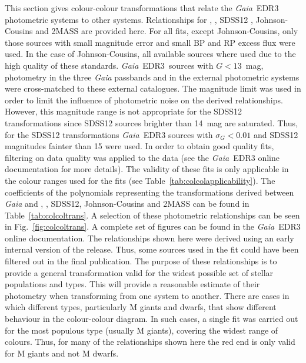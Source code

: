 \documentclass{aa}
\newcommand{\gaia}{\textit{Gaia}\xspace}
\newcommand{\edr}{\gaia~EDR3\xspace}
\newcommand{\xp}{BP and RP\xspace}
\newcommand{\figref}[1]{Fig.~\ref{fig:#1}}
\newcommand{\tabref}[1]{Table~\ref{tab:#1}}
\begin{document}
\begin{appendix}
This section gives colour-colour transformations that relate the \edr photometric systems to other systems. Relationships for
\hip \citep{1997ESASP1200.....E},
\tyctwo \citep{2000A&A...355L..27H},
SDSS12 \citep{2015ApJS..219...12A},
Johnson-Cousins \citep{2000PASP..112..925S} and
2MASS \citep{2006AJ....131.1163S}
are provided here. For all fits, except Johnson-Cousins, only those sources with small magnitude error and small \xp excess flux were used. In the case of Johnson-Cousins, all available sources where used due to the high quality of these standards.
\edr\ sources with $G<13$~mag, photometry in the three \gaia passbands and in the external photometric systems were cross-matched to these external catalogues. The magnitude limit was used in order to limit the influence of photometric noise on the derived relationships. However, this magnitude range is not appropriate for the SDSS12 transformations since SDSS12 sources brighter than 14~mag are saturated. Thus, for the SDSS12 transformations \edr sources with $\sigma_G<0.01$ and SDSS12 magnitudes fainter than 15 were used. 
%
In order to obtain good quality fits, filtering on data quality was applied to the data (see  the \edr online documentation for more details). The validity of these fits is only applicable in the colour ranges used for the fits (see \tabref{colcolapplicability}). The coefficients of the polynomials representing the transformations derived between \gaia and \hip, \tyctwo, SDSS12, Johnson-Cousins and 2MASS can be found in \tabref{colcoltrans}. A selection of these photometric relationships can be seen in \figref{colcoltrans}. A complete set of figures can be found in the \edr online documentation. The relationships shown here were derived using an early internal version of the release. Thus, some sources used in the fit could have been filtered out in the final publication.
%
The purpose of these relationships is to provide a general transformation valid for the widest possible set of stellar populations and types. This will provide a reasonable estimate of their photometry when transforming from one system to another. There are cases in which different types, particularly M giants and dwarfs, that show different behaviour in the colour-colour diagram. In such cases, a single fit was carried out for the most populous type (usually M giants), covering the widest range of colours. Thus, for many of the relationships shown here the red end is only valid for M giants and not  M dwarfs. 
%
\begin{table}
\caption[Applicable range for the relationships]{Applicable range for the relationships between the \edr system and the other photometric systems considered.
}
\end{table}
\end{appendix}
\end{document}
